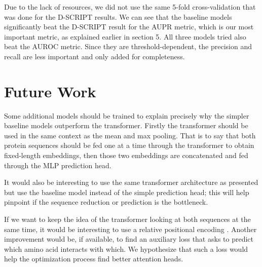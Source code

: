 \documentclass[11pt,a4paper]{article}
\begin{document}
\begin{table}[h!]
    \caption{Metrics comparison of our models and D-SCRIPT on the \textit{H. sapiens} dataset.}
    \label{table_result}
    \centering
    
\end{table}

Due to the lack of resources, we did not use the same 5-fold cross-validation that was done for the D-SCRIPT results. We can see that the baseline models significantly beat the D-SCRIPT result for the AUPR metric, which is our most important metric, as explained earlier in section 5. All three models tried also beat the AUROC metric. Since they are threshold-dependent, the precision and recall are less important and only added for completeness.

\section{Future Work}
Some additional models should be trained to explain precisely why the simpler baseline models outperform the transformer. Firstly the transformer should be used in the same context as the mean and max pooling. That is to say that both protein sequences should be fed one at a time through the transformer to obtain fixed-length embeddings, then those two embeddings are concatenated and fed through the MLP prediction head. 

It would also be interesting to use the same transformer architecture as presented but use the baseline model instead of the simple prediction head; this will help pinpoint if the sequence reduction or prediction is the bottleneck.

If we want to keep the idea of the transformer looking at both sequences at the same time, it would be interesting to use a relative positional encoding \cite{shaw2018selfattention}. Another improvement would be, if available, to find an auxiliary loss that asks to predict which amino acid interacts with which. We hypothesize that such a loss would help the optimization process find better attention heads.
\end{document}
